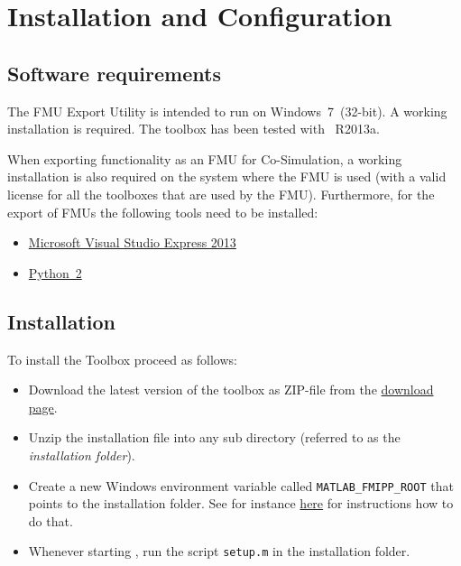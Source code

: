 \chapter{Installation and Configuration}

\section{Software requirements}

The \fmipp \matlab FMU Export Utility is intended to run on Windows~7~(32-bit).
A working \matlab installation is required.
The toolbox has been tested with \matlab~R2013a.


When exporting \matlab functionality as an FMU for Co-Simulation, a working \matlab installation is also required on the system where the FMU is used (with a valid license for all the \matlab toolboxes that are used by the FMU).
Furthermore, for the export of FMUs the following tools need to be installed:
\begin{itemize}

  \item \href{https://www.microsoft.com/en-us/download/details.aspx?id=44914}{Microsoft Visual Studio Express 2013}

  \item \href{https://www.python.org/}{Python~2}
  
\end{itemize}


\section{Installation}
\label{sec:install}

To install the \fmipp \matlab Toolbox proceed as follows:
\begin{itemize}
  \item Download the latest version of the toolbox as ZIP-file from the \href{https://sourceforge.net/projects/matlab-fmu/files/latest/download}{download page}.
  
  \item Unzip the installation file into any sub directory (referred to as the \emph{installation folder}).
  
  \item Create a new Windows environment variable called \texttt{MATLAB\_FMIPP\_ROOT} that points to the installation folder.
  See for instance \href{http://www.computerhope.com/issues/ch000549.htm}{here} for instructions how to do that.
  
  \item Whenever starting \matlab, run the script \texttt{setup.m} in the installation folder.
\end{itemize}


